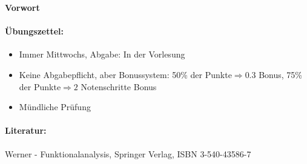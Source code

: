 \cleardoublepage
\thispagestyle{scrplain}

\vphantom{\Huge A}
\begin{flushright}\normalfont\sffamily\Huge\bfseries Vorwort\end{flushright}
\vspace{1cm}
\paragraph*{\"Ubungszettel:}
\begin{itemize}
\item Immer Mittwochs, Abgabe: In der Vorlesung
\item Keine Abgabepflicht, aber Bonussystem: 50\% der Punkte$ \Rightarrow 0.3$ Bonus, 75\% der Punkte$ \Rightarrow 2$ Notenschritte Bonus
\item M\"undliche Pr\"ufung
\end{itemize}
\paragraph*{Literatur:} Werner - Funktionalanalysis, Springer Verlag, ISBN 3-540-43586-7
